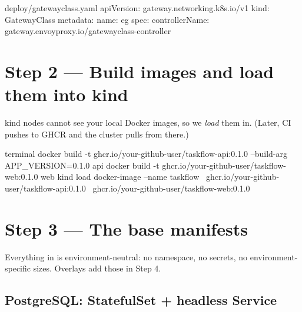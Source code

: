 \begin{yamlcode}{deploy/gatewayclass.yaml}
apiVersion: gateway.networking.k8s.io/v1
kind: GatewayClass
metadata:
  name: eg
spec:
  controllerName: gateway.envoyproxy.io/gatewayclass-controller
\end{yamlcode}

\section{Step 2 --- Build images and load them into kind}

kind nodes cannot see your local Docker images, so we \emph{load} them in. (Later,
CI pushes to GHCR and the cluster pulls from there.)

\begin{bashcode}{terminal}
docker build -t ghcr.io/your-github-user/taskflow-api:0.1.0 --build-arg APP_VERSION=0.1.0 api
docker build -t ghcr.io/your-github-user/taskflow-web:0.1.0 web
kind load docker-image --name taskflow \
  ghcr.io/your-github-user/taskflow-api:0.1.0 \
  ghcr.io/your-github-user/taskflow-web:0.1.0
\end{bashcode}

\section{Step 3 --- The base manifests}

Everything in  is environment-neutral: no namespace, no secrets, no
environment-specific sizes. Overlays add those in Step 4.

\subsection{PostgreSQL: StatefulSet + headless Service}

